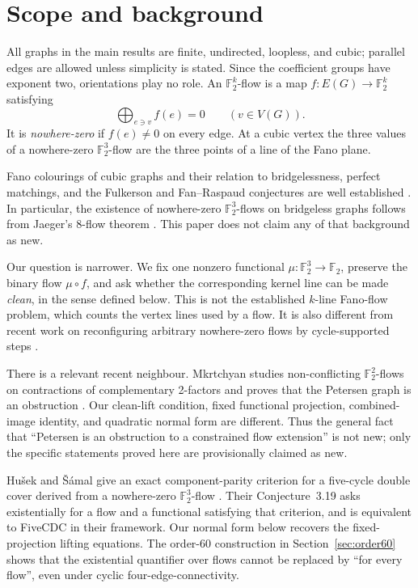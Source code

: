 \documentclass[11pt]{article}
\theoremstyle{definition}
\theoremstyle{remark}
\newcommand{\F}{\mathbb F}
\begin{document}
\section{Scope and background}

All graphs in the main results are finite, undirected, loopless, and
cubic; parallel edges are allowed unless simplicity is stated.  Since
the coefficient groups have exponent two, orientations play no role.
An \(\F_2^k\)-flow is a map \(f:E(G)\to\F_2^k\) satisfying
\[
                  \bigoplus_{e\ni v}f(e)=0
                  \qquad(v\in V(G)).
\]
It is \emph{nowhere-zero} if \(f(e)\ne0\) on every edge.  At a cubic
vertex the three values of a nowhere-zero \(\F_2^3\)-flow are the three
points of a line of the Fano plane.

Fano colourings of cubic graphs and their relation to bridgelessness,
perfect matchings, and the Fulkerson and Fan--Raspaud conjectures are
well established
\cite{holroyd2004,macajova2005,kral2009,jin2018,karabas2024}.
In particular, the existence of nowhere-zero \(\F_2^3\)-flows on
bridgeless graphs follows from Jaeger's 8-flow theorem
\cite{jaeger1979}.  This paper does not claim any of that background as
new.

Our question is narrower.  We fix one nonzero functional
\(\mu:\F_2^3\to\F_2\), preserve the binary flow \(\mu\circ f\), and ask
whether the corresponding kernel line can be made \emph{clean}, in the
sense defined below.  This is not the established \(k\)-line Fano-flow
problem, which counts the vertex lines used by a flow.  It is also
different from recent work on reconfiguring arbitrary nowhere-zero
flows by cycle-supported steps \cite{cranston2026}.

There is a relevant recent neighbour.  Mkrtchyan studies
non-conflicting \(\F_2^2\)-flows on contractions of complementary
2-factors and proves that the Petersen graph is an obstruction
\cite[Proposition~2.21]{mkrtchyan2025}.  Our clean-lift condition,
fixed functional projection, combined-image identity, and quadratic
normal form are different.  Thus the general fact that ``Petersen is an
obstruction to a constrained flow extension'' is not new; only the
specific statements proved here are provisionally claimed as new.

Hu\v{s}ek and \v{S}\'amal give an exact component-parity criterion for a
five-cycle double cover derived from a nowhere-zero
\(\F_2^3\)-flow \cite[Theorem~3.16]{husek2026}.  Their
Conjecture~3.19 asks existentially for a flow and a functional satisfying
that criterion, and is equivalent to FiveCDC in their framework.  Our
normal form below recovers the fixed-projection lifting equations.  The
order-60 construction in Section~\ref{sec:order60} shows that the
existential quantifier over flows cannot be replaced by ``for every
flow'', even under cyclic four-edge-connectivity.
\end{document}

